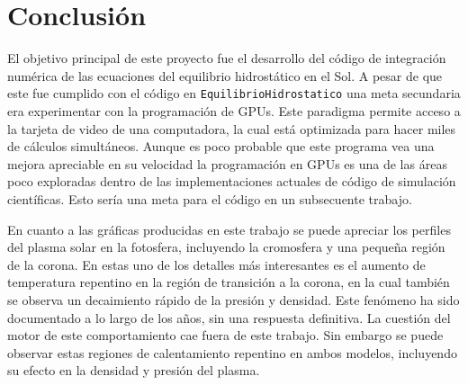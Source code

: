 \section{Conclusión}

El objetivo principal de este proyecto fue el desarrollo del código de integración numérica de las ecuaciones del equilibrio hidrostático en el Sol. A pesar de que este fue cumplido con el código en \verb|EquilibrioHidrostatico| una meta secundaria era experimentar con la programación de GPUs. Este paradigma permite acceso a la tarjeta de video de una computadora, la cual está optimizada para hacer miles de cálculos simultáneos. Aunque es poco probable que este programa vea una mejora apreciable en su velocidad la programación en GPUs es una de las áreas poco exploradas dentro de las implementaciones actuales de código de simulación científicas. Esto sería una meta para el código en un subsecuente trabajo.

En cuanto a las gráficas producidas en este trabajo se puede apreciar los perfiles del plasma solar en la fotosfera, incluyendo la cromosfera y una pequeña región de la corona. En estas uno de los detalles más interesantes es el aumento de temperatura repentino en la región de transición a la corona, en la cual también se observa un decaimiento rápido de la presión y densidad. Este fenómeno ha sido documentado a lo largo de los años, sin una respuesta definitiva. \cite{coronaHeatingProblem} La cuestión del motor de este comportamiento cae fuera de este trabajo. Sin embargo se puede observar estas regiones de calentamiento repentino en ambos modelos, incluyendo su efecto en la densidad y presión del plasma.
